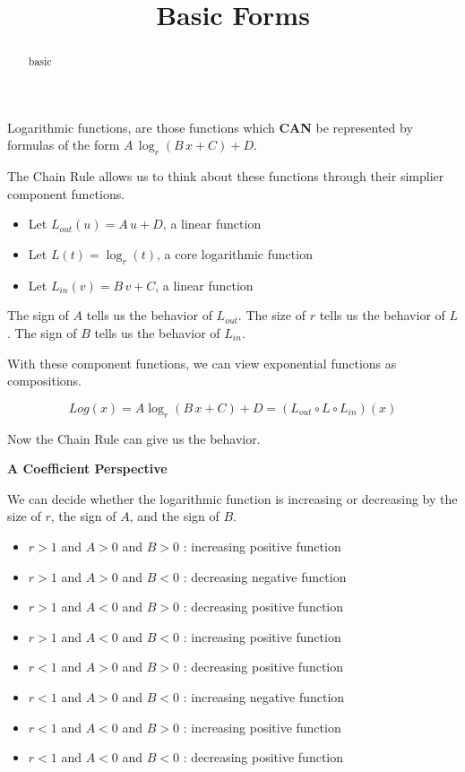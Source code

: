 \documentclass{ximera}
\title{Basic Forms}
\begin{document}
\begin{abstract}
basic
\end{abstract}
\maketitle







Logarithmic functions, are those functions which \textbf{\textcolor{red!80!black}{CAN}} be represented by formulas of the form $A \, \log_r(B \, x + C) + D$.  


The Chain Rule allows us to think about these functions through their simplier component functions.



\begin{itemize}
\item Let $L_{out}(u) = A \, u + D$, a linear function
\item Let $L(t) = \log_r(t)$, a core logarithmic function
\item Let $L_{in}(v) = B \, v + C$, a linear function
\end{itemize}


The sign of $A$ tells us the behavior of $L_{out}$.
The size of $r$ tells us the behavior of $L$.
The sign of $B$ tells us the behavior of $L_{in}$.


With these component functions, we can view exponential functions as compositions.


\[  Log(x) = A \log_r(B \, x + C) + D = (L_{out} \circ L \circ L_{in})(x) \]


Now the Chain Rule can give us the behavior.



\textbf{\textcolor{blue!55!black}{A Coefficient Perspective}} 


We can decide whether the logarithmic function is increasing or decreasing by the size of $r$, the sign of $A$, and the sign of $B$. 





\begin{itemize}
\item $r > 1$ and $A > 0$ and $B > 0$ : increasing positive function
\item $r > 1$ and $A > 0$ and $B < 0$ : decreasing negative function  
\item $r > 1$ and $A < 0$ and $B > 0$ : decreasing positive function
\item $r > 1$ and $A < 0$ and $B < 0$ : increasing positive function
\item $r < 1$ and $A > 0$ and $B > 0$ : decreasing positive function
\item $r < 1$ and $A > 0$ and $B < 0$ : increasing negative function  
\item $r < 1$ and $A < 0$ and $B > 0$ : increasing positive function
\item $r < 1$ and $A < 0$ and $B < 0$ : decreasing positive function
\end{itemize}
\end{document}
